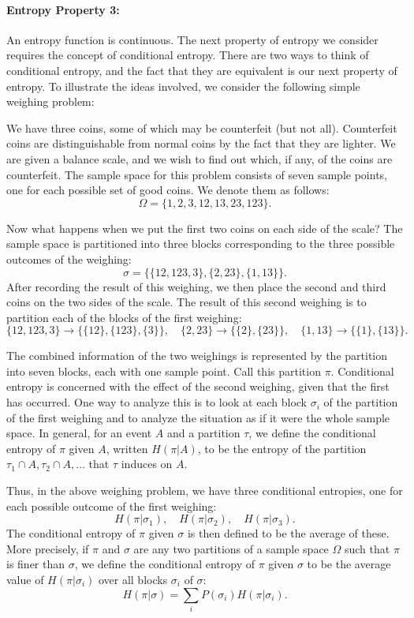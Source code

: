 \documentclass{report}
\begin{document}
\paragraph{Entropy Property 3:} 
An entropy function is continuous.
The next property of entropy we consider requires the concept of conditional entropy. There are two ways to think of conditional entropy, and the fact that they are equivalent is our next property of entropy. To illustrate the ideas involved, we consider the following simple weighing problem:

We have three coins, some of which may be counterfeit (but not all). Counterfeit coins are distinguishable from normal coins by the fact that they are lighter. We are given a balance scale, and we wish to find out which, if any, of the coins are counterfeit. The sample space for this problem consists of seven sample points, one for each possible set of good coins. We denote them as follows:
\[
\Omega = \{1, 2, 3, 12, 13, 23, 123\}.
\]

Now what happens when we put the first two coins on each side of the scale? The sample space is partitioned into three blocks corresponding to the three possible outcomes of the weighing:
\[
\sigma = \{\{12, 123, 3\}, \{2, 23\}, \{1, 13\}\}.
\]
After recording the result of this weighing, we then place the second and third coins on the two sides of the scale. The result of this second weighing is to partition each of the blocks of the first weighing:
\[
\{12, 123, 3\} \to \{\{12\}, \{123\}, \{3\}\}, \quad 
\{2, 23\} \to \{\{2\}, \{23\}\}, \quad 
\{1, 13\} \to \{\{1\}, \{13\}\}.
\]

The combined information of the two weighings is represented by the partition into seven blocks, each with one sample point. Call this partition \( \pi \). Conditional entropy is concerned with the effect of the second weighing, given that the first has occurred. One way to analyze this is to look at each block \( \sigma_i \) of the partition of the first weighing and to analyze the situation as if it were the whole sample space. In general, for an event \( A \) and a partition \( \tau \), we define the conditional entropy of \( \pi \) given \( A \), written \( H(\pi|A) \), to be the entropy of the partition \( \tau_1 \cap A, \tau_2 \cap A, \ldots \) that \( \tau \) induces on \( A \). 

Thus, in the above weighing problem, we have three conditional entropies, one for each possible outcome of the first weighing:
\[
H(\pi|\sigma_1), \quad H(\pi|\sigma_2), \quad H(\pi|\sigma_3).
\]
The conditional entropy of \( \pi \) given \( \sigma \) is then defined to be the average of these. More precisely, if \( \pi \) and \( \sigma \) are any two partitions of a sample space \( \Omega \) such that \( \pi \) is finer than \( \sigma \), we define the conditional entropy of \( \pi \) given \( \sigma \) to be the average value of \( H(\pi|\sigma_i) \) over all blocks \( \sigma_i \) of \( \sigma \):
\[
H(\pi|\sigma) = \sum_i P(\sigma_i) H(\pi|\sigma_i).
\]
\end{document}
